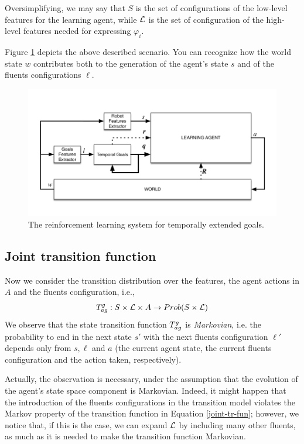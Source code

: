 Oversimplifying, we may say that $S$ is the set of configurations of
the low-level features for the learning agent, while $\mathcal{L}$ is
the set of configuration of the high-level features needed for
expressing $\varphi_i$.

Figure \ref{fig:rl-schema} depicts the above described scenario. You can recognize how the world state $w$ contributes both to the generation of the agent's state $s$ and of the fluents configurations $\ell$.

\begin{figure}[h]
	\centering
	\includegraphics[width=\textwidth]{images/rl-two-representations}
	\caption{The reinforcement learning system for temporally extended goals.}\label{fig:rl-schema}
\end{figure}

\subsection{Joint transition function}
Now we consider the transition distribution over the features, the agent actions in $A$ and the fluents configuration, i.e.,
\begin{equation}\label{joint-tr-fun}
T_{ag}^{g} : S\times \mathcal{L} \times A \rightarrow Prob(S\times \mathcal{L})
\end{equation}
We observe that the state transition function $T_{ag}^{g}$ is \emph{Markovian}, i.e. the probability to end in the next state $s'$ with the next fluents configuration $\ell'$ depends only from $s, \ell$ and $a$ (the current agent state, the current fluents configuration and the action taken, respectively).

Actually, the observation is necessary, under the assumption that the evolution of the agent's state space component is Markovian. Indeed, it might happen that the introduction of the fluents configurations in the transition model violates the Markov property of the transition function in Equation \ref{joint-tr-fun}; however, we notice that, if this is the case, we can expand $\mathcal{L}$ by including many other fluents, as much as it is needed to make the transition function Markovian.

